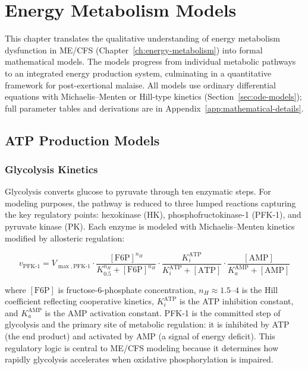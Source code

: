 \chapter{Energy Metabolism Models}
\label{ch:energy-metabolism-models}

This chapter translates the qualitative understanding of energy metabolism dysfunction in ME/CFS (Chapter~\ref{ch:energy-metabolism}) into formal mathematical models. The models progress from individual metabolic pathways to an integrated energy production system, culminating in a quantitative framework for post-exertional malaise. All models use ordinary differential equations with Michaelis--Menten or Hill-type kinetics (Section~\ref{sec:ode-models}); full parameter tables and derivations are in Appendix~\ref{app:mathematical-details}.



\section{ATP Production Models}
\label{sec:atp-production-models}

\subsection{Glycolysis Kinetics}
\label{sec:glycolysis-kinetics}

Glycolysis converts glucose to pyruvate through ten enzymatic steps. For modeling purposes, the pathway is reduced to three lumped reactions capturing the key regulatory points: hexokinase (HK), phosphofructokinase-1 (PFK-1), and pyruvate kinase (PK). Each enzyme is modeled with Michaelis--Menten kinetics modified by allosteric regulation:

\begin{equation}
\label{eq:pfk1}
v_{\text{PFK-1}} = V_{\max,\text{PFK-1}} \cdot \frac{[\text{F6P}]^{n_H}}{K_{0.5}^{n_H} + [\text{F6P}]^{n_H}} \cdot \frac{K_i^{\text{ATP}}}{K_i^{\text{ATP}} + [\text{ATP}]} \cdot \frac{[\text{AMP}]}{K_a^{\text{AMP}} + [\text{AMP}]}
\end{equation}

where $[\text{F6P}]$ is fructose-6-phosphate concentration, $n_H \approx 1.5$--$4$ is the Hill coefficient reflecting cooperative kinetics, $K_i^{\text{ATP}}$ is the ATP inhibition constant, and $K_a^{\text{AMP}}$ is the AMP activation constant. PFK-1 is the committed step of glycolysis and the primary site of metabolic regulation: it is inhibited by ATP (the end product) and activated by AMP (a signal of energy deficit). This regulatory logic is central to ME/CFS modeling because it determines how rapidly glycolysis accelerates when oxidative phosphorylation is impaired.

